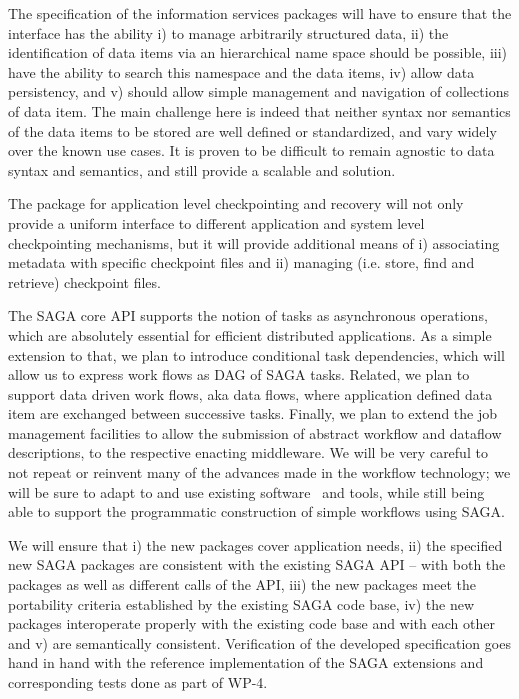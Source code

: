 \documentclass[10pt,letterpaper]{article}
\begin{document}
 The specification of the
information services packages will have to ensure that the
interface has the ability i) to manage arbitrarily structured
data, ii) the identification of data items via an hierarchical
name space should be possible, iii) have the ability to search
this namespace and the data items, iv) allow data persistency,
and v) should allow simple management and navigation of
collections of data item. The main challenge here is indeed that
neither syntax nor semantics of the data items to be stored are
well defined or standardized, and vary widely over the known use
cases.  It is proven to be difficult to remain agnostic to data
syntax and semantics, and still provide a scalable and
 solution.  

 The package for application level
checkpointing and recovery will not only provide a uniform
interface to different application and system level
checkpointing mechanisms, but it will provide additional means
of i) associating metadata with specific checkpoint files and
ii) managing (i.e. store, find and retrieve) checkpoint files.

 The SAGA core API supports the notion of tasks
as asynchronous operations, which are absolutely essential for
efficient distributed applications.  As a simple extension to that, we
plan to introduce conditional task dependencies, which will allow us
to express work flows as DAG of SAGA tasks.  Related, we plan to
support data driven work flows, aka data flows, where application
defined data item are exchanged between successive tasks.  Finally, we
plan to extend the job management facilities to allow the submission
of abstract workflow and dataflow descriptions, to the respective
enacting middleware. We will be very careful to not repeat or reinvent
many of the advances made in the workflow technology; we will be sure
to adapt to and use existing software~\cite{saga_condor_talk} and
tools, while still being able to support the programmatic construction
of simple workflows using SAGA.

We will ensure that i) the new packages cover application needs, ii)
the specified new SAGA packages are consistent with the existing SAGA
API -- with both the packages as well as different calls of the API,
iii) the new packages meet the portability criteria established by the
existing SAGA code base, iv) the new packages interoperate properly
with the existing code base and with each other and v) are
semantically consistent.  Verification of the developed specification
goes hand in hand with the reference implementation of the SAGA
extensions and corresponding tests done as part of WP-4. 
\end{document}
